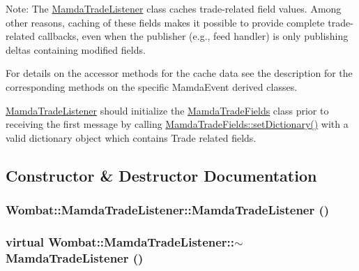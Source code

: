 Note: The \hyperlink{classWombat_1_1MamdaTradeListener}{Mamda\-Trade\-Listener} class caches trade-related field values. Among other reasons, caching of these fields makes it possible to provide complete trade-related callbacks, even when the publisher (e.g., feed handler) is only publishing deltas containing modified fields.

For details on the accessor methods for the cache data see the description for the corresponding methods on the specific Mamda\-Event derived classes.

\hyperlink{classWombat_1_1MamdaTradeListener}{Mamda\-Trade\-Listener} should initialize the \hyperlink{classWombat_1_1MamdaTradeFields}{Mamda\-Trade\-Fields} class prior to receiving the first message by calling \hyperlink{classWombat_1_1MamdaTradeFields_24f9db0ce37349e5a86bcd18f9c93d27}{Mamda\-Trade\-Fields::set\-Dictionary()} with a valid dictionary object which contains Trade related fields. 



\subsection{Constructor \& Destructor Documentation}
\hypertarget{classWombat_1_1MamdaTradeListener_eda66f3805431df1c6b22bf73ad3d482}{
\subsubsection[MamdaTradeListener]{\setlength{\rightskip}{0pt plus 5cm}Wombat::Mamda\-Trade\-Listener::Mamda\-Trade\-Listener ()}}
\label{classWombat_1_1MamdaTradeListener_eda66f3805431df1c6b22bf73ad3d482}


\hypertarget{classWombat_1_1MamdaTradeListener_b6bd421589362265963eab4056bc459e}{
\subsubsection[$\sim$MamdaTradeListener]{\setlength{\rightskip}{0pt plus 5cm}virtual Wombat::Mamda\-Trade\-Listener::$\sim$Mamda\-Trade\-Listener ()}}
\label{classWombat_1_1MamdaTradeListener_b6bd421589362265963eab4056bc459e}





